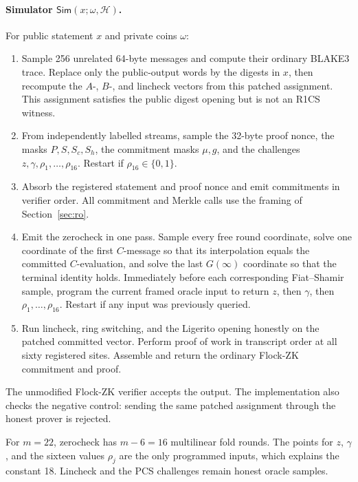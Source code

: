 \documentclass[11pt]{article}
\theoremstyle{definition}
\newcommand{\RO}{\mathcal{H}}
\begin{document}
\paragraph{Simulator $\mathsf{Sim}(x;\omega,\RO)$.}
For public statement $x$ and private coins $\omega$:
\begin{enumerate}
\item Sample 256 unrelated 64-byte messages and compute their ordinary BLAKE3
      trace.  Replace only the public-output words by the digests in $x$, then
      recompute the $A$-, $B$-, and lincheck vectors from this patched
      assignment.  This assignment satisfies the public digest opening but is
      not an R1CS witness.
\item From independently labelled streams, sample the 32-byte proof nonce,
      the masks $P,S,S_c,S_h$, the commitment masks $\mu,g$, and the challenges
      $z,\gamma,\rho_1,\ldots,\rho_{16}$.  Restart if
      $\rho_{16}\in\{0,1\}$.
\item Absorb the registered statement and proof nonce and emit commitments in
      verifier order.  All commitment and Merkle calls use the framing of
      Section~\ref{sec:ro}.
\item Emit the zerocheck in one pass.  Sample every free round coordinate,
      solve one coordinate of the first $C$-message so that its interpolation
      equals the committed $C$-evaluation, and solve the last
      $G(\infty)$ coordinate so that the terminal identity holds.  Immediately
      before each corresponding Fiat--Shamir sample, program the current
      framed oracle input to return $z$, then $\gamma$, then
      $\rho_1,\ldots,\rho_{16}$.  Restart if any input was previously queried.
\item Run lincheck, ring switching, and the Ligerito opening honestly on the
      patched committed vector.  Perform proof of work in transcript order at
      all sixty registered sites.  Assemble and return the ordinary Flock-ZK
      commitment and proof.
\end{enumerate}
The unmodified Flock-ZK verifier accepts the output.  The implementation also
checks the negative control: sending the same patched assignment through the
honest prover is rejected.

For $m=22$, zerocheck has $m-6=16$ multilinear fold rounds.  The points for
$z$, $\gamma$, and the sixteen values $\rho_j$ are the only programmed inputs,
which explains the constant 18.  Lincheck and the PCS challenges remain honest
oracle samples.
\end{document}

